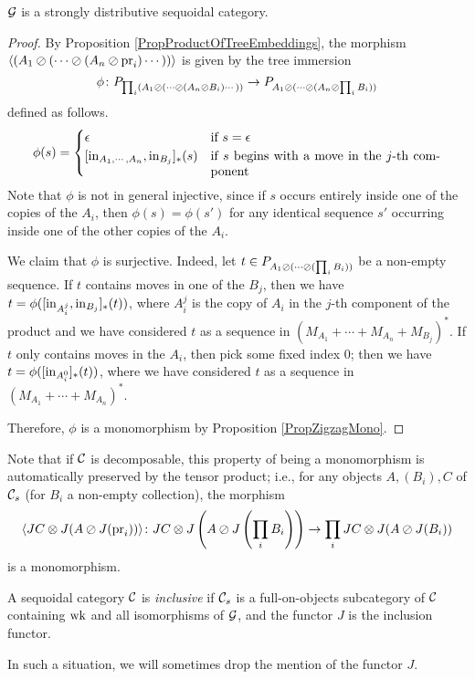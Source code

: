 \documentclass[11pt]{report}
\begin{document}
\begin{proposition}
  $\mathcal G$ is a strongly distributive sequoidal category.
\end{proposition}
\begin{proof}
  By Proposition \ref{PropProductOfTreeEmbeddings}, the morphism $\langle (A_1\oslash(\cdots\oslash(A_n \oslash\operatorname{pr}_i)\cdots))\rangle$ is given by the tree immersion 
  \[
    \phi\colon P_{\prod_i (A_1 \oslash(\cdots\oslash(A_n\oslash B_i)\cdots))} \to P_{A_1\oslash(\cdots\oslash(A_n\oslash \prod_iB_i))}
    \]
  defined as follows.
  \[
    \phi(s) = \begin{cases}
      \epsilon & \text{if $s=\epsilon$} \\
      [\inj_{A_1,\cdots,A_n},\inj_{B_j}]_*(s) & \parbox[t][][t]{180pt}{if $s$ begins with a move in the $j$-th component}
    \end{cases}
    \]
  Note that $\phi$ is not in general injective, since if $s$ occurs entirely inside one of the copies of the $A_i$, then $\phi(s)=\phi(s')$ for any identical sequence $s'$ occurring inside one of the other copies of the $A_i$.

  We claim that $\phi$ is surjective.  
  Indeed, let $t\in P_{A_1\oslash(\cdots \oslash(\prod_i B_i))}$ be a non-empty sequence.  
  If $t$ contains moves in one of the $B_j$, then we have $t=\phi([\operatorname{in}_{A_i^j},\operatorname{in}_{B_j}]_*(t))$, where $A_i^j$ is the copy of $A_i$ in the $j$-th component of the product and we have considered $t$ as a sequence in $(M_{A_1} + \cdots + M_{A_n} + M_{B_j})^*$.  
  If $t$ only contains moves in the $A_i$, then pick some fixed index $0$; then we have $t=\phi([\operatorname{in}_{A_i^0}]_*(t))$, where we have considered $t$ as a sequence in $(M_{A_1} + \cdots + M_{A_n})^*$.

  Therefore, $\phi$ is a monomorphism by Proposition \ref{PropZigzagMono}.
\end{proof}

Note that if ${\mathcal{C}}$ is decomposable, this property of being a monomorphism is automatically preserved by the tensor product; i.e., for any objects $A,(B_i),C$ of ${\mathcal{C}}_s$ (for $B_i$ a non-empty collection), the morphism
\[
  \langle JC \otimes J(A \oslash J(\operatorname{pr}_i))\rangle \colon JC \otimes J\left(A \oslash J\left(\prod_iB_i\right)\right) \to \prod_i JC \otimes J(A \oslash J(B_i))
  \]
is a monomorphism.

\begin{definition}
  A sequoidal category ${\mathcal{C}}$ is \emph{inclusive} if ${\mathcal{C}}_s$ is a full-on-objects subcategory of ${\mathcal{C}}$ containing $\operatorname{wk}$ and all isomorphisms of $\mathcal G$, and the functor $J$ is the inclusion functor.
\end{definition}
In such a situation, we will sometimes drop the mention of the functor $J$.
\end{document}
